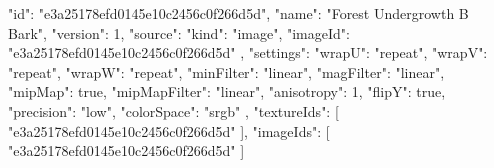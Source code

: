 {
  "id": "e3a25178efd0145e10c2456c0f266d5d",
  "name": "Forest Undergrowth B Bark",
  "version": 1,
  "source": {
    "kind": "image",
    "imageId": "e3a25178efd0145e10c2456c0f266d5d"
  },
  "settings": {
    "wrapU": "repeat",
    "wrapV": "repeat",
    "wrapW": "repeat",
    "minFilter": "linear",
    "magFilter": "linear",
    "mipMap": true,
    "mipMapFilter": "linear",
    "anisotropy": 1,
    "flipY": true,
    "precision": "low",
    "colorSpace": "srgb"
  },
  "textureIds": [
    "e3a25178efd0145e10c2456c0f266d5d"
  ],
  "imageIds": [
    "e3a25178efd0145e10c2456c0f266d5d"
  ]
}
